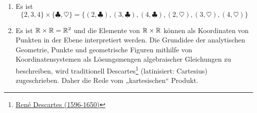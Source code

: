 \begin{bsp} \quad
    \begin{enumerate}
        \item Es ist
            \[ \{2,3,4\}\times \{ \clubsuit,\heartsuit\} = \{ (2,\clubsuit), (3,\clubsuit), (4,\clubsuit), (2,\heartsuit), (3,\heartsuit), (4,\heartsuit) \}\]
        \item Es ist $\mathbb R\times \mathbb R=\mathbb R^2$ und die Elemente von $\mathbb R\times \mathbb R$ können als Koordinaten von Punkten in der Ebene interpretiert werden. Die Grundidee der analytischen Geometrie, Punkte und geometrische Figuren mithilfe von Koordinatensystemen als Lösungsmengen algebraischer Gleichungen zu beschreiben, wird traditionell Descartes\footnote{\href{https://de.wikipedia.org/wiki/Rene_Descartes}{René Descartes (1596-1650)}} (latinisiert: Cartesius) zugeschrieben. Daher die Rede vom „kartesischen“ Produkt.
        \begin{comment}
        \item Dagegen lässt sich $\N\times\N$ als zweidimensionales „Gitter“ veranschaulichen:
            \[ \begin{matrix}
                \vdots &&&& \\
                (0,3) & \vdots &&& \\
                (0,2) & (1,2) &&& \\
                (0,1) & (1,1) & (2,1) & \cdots & \\
                (0,0) & (1,0) & (2,0) & (3,0) & \cdots
            \end{matrix} \]
        \end{comment}
    \end{enumerate}
\end{bsp}


